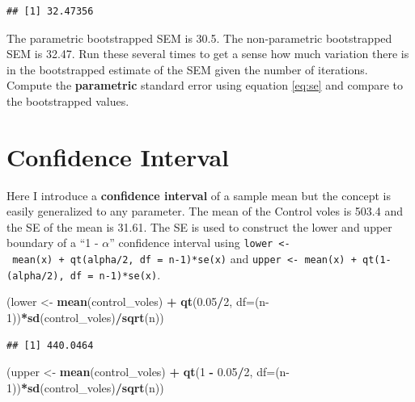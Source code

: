 \documentclass[]{book}
\newenvironment{Shaded}{\begin{snugshade}}{\end{snugshade}}
\newcommand{\DataTypeTok}[1]{\textcolor[rgb]{0.13,0.29,0.53}{#1}}
\newcommand{\DecValTok}[1]{\textcolor[rgb]{0.00,0.00,0.81}{#1}}
\newcommand{\FloatTok}[1]{\textcolor[rgb]{0.00,0.00,0.81}{#1}}
\newcommand{\KeywordTok}[1]{\textcolor[rgb]{0.13,0.29,0.53}{\textbf{#1}}}
\newcommand{\NormalTok}[1]{#1}
\newcommand{\OperatorTok}[1]{\textcolor[rgb]{0.81,0.36,0.00}{\textbf{#1}}}
\newcommand{\StringTok}[1]{\textcolor[rgb]{0.31,0.60,0.02}{#1}}
\begin{document}
\begin{verbatim}
## [1] 32.47356
\end{verbatim}

The parametric bootstrapped SEM is 30.5. The non-parametric bootstrapped SEM is 32.47. Run these several times to get a sense how much variation there is in the bootstrapped estimate of the SEM given the number of iterations. Compute the \textbf{parametric} standard error using equation \eqref{eq:se} and compare to the bootstrapped values.

\hypertarget{confidence-interval}{%
\section{Confidence Interval}\label{confidence-interval}}

Here I introduce a \textbf{confidence interval} of a sample mean but the concept is easily generalized to any parameter. The mean of the Control voles is 503.4 and the SE of the mean is 31.61. The SE is used to construct the lower and upper boundary of a ``1 - \(\alpha\)'' confidence interval using \texttt{lower\ \textless{}-\ mean(x)\ +\ qt(alpha/2,\ df\ =\ n-1)*se(x)} and \texttt{upper\ \textless{}-\ mean(x)\ +\ qt(1-(alpha/2),\ df\ =\ n-1)*se(x)}.

\begin{Shaded}
\begin{Highlighting}[]
\NormalTok{(lower <-}\StringTok{ }\KeywordTok{mean}\NormalTok{(control_voles) }\OperatorTok{+}\StringTok{ }\KeywordTok{qt}\NormalTok{(}\FloatTok{0.05}\OperatorTok{/}\DecValTok{2}\NormalTok{, }\DataTypeTok{df=}\NormalTok{(n}\DecValTok{-1}\NormalTok{))}\OperatorTok{*}\KeywordTok{sd}\NormalTok{(control_voles)}\OperatorTok{/}\KeywordTok{sqrt}\NormalTok{(n))}
\end{Highlighting}
\end{Shaded}

\begin{verbatim}
## [1] 440.0464
\end{verbatim}

\begin{Shaded}
\begin{Highlighting}[]
\NormalTok{(upper <-}\StringTok{ }\KeywordTok{mean}\NormalTok{(control_voles) }\OperatorTok{+}\StringTok{ }\KeywordTok{qt}\NormalTok{(}\DecValTok{1} \OperatorTok{-}\StringTok{ }\FloatTok{0.05}\OperatorTok{/}\DecValTok{2}\NormalTok{, }\DataTypeTok{df=}\NormalTok{(n}\DecValTok{-1}\NormalTok{))}\OperatorTok{*}\KeywordTok{sd}\NormalTok{(control_voles)}\OperatorTok{/}\KeywordTok{sqrt}\NormalTok{(n))}
\end{Highlighting}
\end{Shaded}
\end{document}
